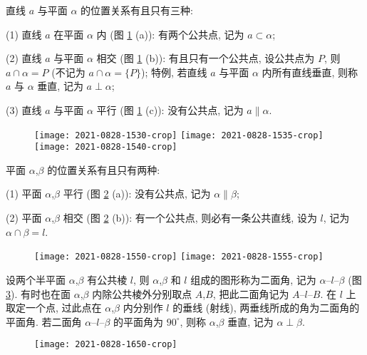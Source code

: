 直线 $a$ 与平面 $\alpha$ 的位置关系有且只有三种:

(1) 直线 $a$ 在平面 $\alpha$ 内 (图 \ref{fig:2021-0828-1530} (a)): 有两个公共点, 记为 $a\subset \alpha$;

(2) 直线 $a$ 与平面 $\alpha$ 相交 (图 \ref{fig:2021-0828-1530} (b)): 有且只有一个公共点, 设公共点为 $P$, 则 $a\cap \alpha= P$ (不记为 $a\cap \alpha= \{P\}$); 特例, 若直线 $a$ 与平面 $\alpha$ 内所有直线垂直, 则称 $a$ 与 $\alpha$ 垂直, 记为 $a\perp \alpha$;

(3) 直线 $a$ 与平面 $\alpha$ 平行 (图 \ref{fig:2021-0828-1530} (c)): 没有公共点, 记为 $a\parallel \alpha$.

\begin{figure}[htb]
    \small\centering
    \texttt{[image: 2021-0828-1530-crop]}\qquad
    \texttt{[image: 2021-0828-1535-crop]}\qquad
    \texttt{[image: 2021-0828-1540-crop]}
    \caption{}\label{fig:2021-0828-1530}
\end{figure}

平面 $\alpha$,$\beta$ 的位置关系有且只有两种:

(1) 平面 $\alpha$,$\beta$ 平行 (图 \ref{fig:2021-0828-1550} (a)): 没有公共点, 记为 $\alpha\parallel\beta$;

(2) 平面 $\alpha$,$\beta$ 相交 (图 \ref{fig:2021-0828-1550} (b)): 有一个公共点, 则必有一条公共直线, 设为 $l$, 记为 $\alpha\cap\beta= l$.
 
\begin{figure}[htb]
    \small\centering
    \texttt{[image: 2021-0828-1550-crop]}\qquad
    \texttt{[image: 2021-0828-1555-crop]}
    \caption{}\label{fig:2021-0828-1550}
\end{figure}

设两个半平面 $\alpha$,$\beta$ 有公共棱 $l$, 则 $\alpha$,$\beta$ 和 $l$ 组成的图形称为二面角, 记为 $\alpha\text{--}l\text{--}\beta$ (图 \ref{fig:2021-0828-1650}). 有时也在面 $\alpha$,$\beta$ 内除公共棱外分别取点 $A$,$B$, 把此二面角记为 $A\text{--}l\text{--}B$. 在 $l$ 上取定一个点, 过此点在 $\alpha$,$\beta$ 内分别作 $l$ 的垂线 (射线), 两垂线所成的角为二面角的平面角. 
若二面角 $\alpha\text{--}l\text{--}\beta$ 的平面角为 $90^\circ$, 则称 $\alpha$,$\beta$ 垂直, 记为 $\alpha\perp \beta$.

\begin{figure}[htb]
    \small\centering
    \texttt{[image: 2021-0828-1650-crop]}
    \caption{}\label{fig:2021-0828-1650}
\end{figure}

